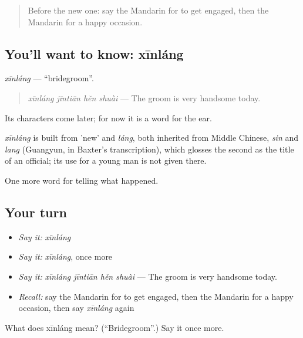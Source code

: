 \begin{quote}
Before the new one: say the Mandarin for to get engaged, then the Mandarin for a happy occasion.
\end{quote}

\subsection*{You'll want to know: xīnláng}
\emph{xīnláng} — \textquotedblleft{}bridegroom\textquotedblright{}.

\begin{quote}
\emph{xīnláng jīntiān hěn shuài} — The groom is very handsome today.
\end{quote}

Its characters come later; for now it is a word for the ear.

\begin{cousinweb}
\emph{xīnláng} is built from  'new' and \emph{láng}, both inherited from Middle Chinese, \emph{sin} and \emph{lang} (Guangyun, in Baxter's transcription), which glosses the second as the title of an official; its use for a young man is not given there.
\end{cousinweb}

\begin{grammarlens}[title={What you've built}]
One more word for telling what happened.
\end{grammarlens}

\subsection*{Your turn}
\begin{itemize}
\raggedright
  \item \emph{Say it:} \emph{xīnláng}
  \item \emph{Say it:} \emph{xīnláng}, once more
  \item \emph{Say it:} \emph{xīnláng jīntiān hěn shuài} — The groom is very handsome today.
  \item \emph{Recall:} say the Mandarin for to get engaged, then the Mandarin for a happy occasion, then say \emph{xīnláng} again
\end{itemize}

\begin{tcolorbox}[breakable,colback=teal!4,colframe=teal!35!black,title={Before you move on}]
What does xīnláng mean? (\textquotedblleft{}Bridegroom\textquotedblright{}.) Say it once more.
\end{tcolorbox}
